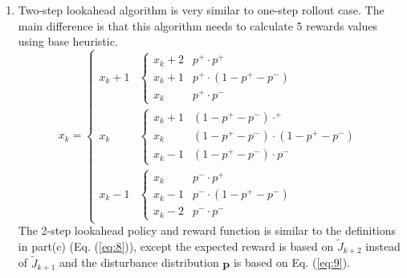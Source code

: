 \documentclass[11pt]{article}
\begin{document}
\begin{enumerate}[label=(\alph*)]
    \item
    Two-step lookahead algorithm is very similar to one-step rollout case. The main difference is that this algorithm needs to calculate 5 rewards values using base heuristic.
    \begin{equation}\label{eq:9}
    x_k = \begin{cases}
        x_k + 1 & \begin{cases}
            x_k + 2 & p^+ \cdot p^+ \\
            x_k + 1 & p^+ \cdot (1-p^+ - p^-) \\
            x_k & p^+ \cdot p^-
        \end{cases} \\
        x_k & \begin{cases}
            x_k + 1 & (1-p^+ - p^-) \cdotp^+ \\
            x_k & (1-p^+ - p^-) \cdot (1-p^+ - p^-)\\
            x_k - 1 & (1-p^+ - p^-) \cdot p^-
        \end{cases} \\
        x_k - 1 & \begin{cases}
            x_k & p^- \cdot p^+ \\
            x_k - 1 & p^- \cdot (1-p^+ - p^-) \\
            x_k - 2 & p^- \cdot p^-
        \end{cases}
    \end{cases}
    \end{equation}
    The 2-step lookahead policy and reward function is similar to the definitions in part(c) (Eq. (\ref{eq:8})), except the expected reward is based on $\tilde{J}_{k+2}$ instead of $\tilde{J}_{k+1}$ and the disturbance distribution $\boldsymbol p$ is based on Eq. (\ref{eq:9}).
    

\end{enumerate}
\end{document}
